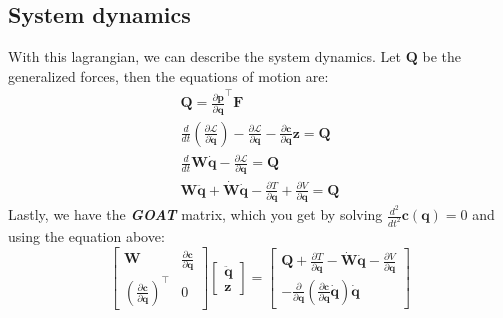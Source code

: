 \subsection{System dynamics}
With this lagrangian, we can describe the system dynamics. Let $\mathbf{Q}$ be the generalized forces, then the equations of motion are:
\begin{subequations}
    \begin{align}
    \mathbf{Q} = \frac{\partial \mathbf{p}}{\partial \mathbf{q}}^\top \mathbf{F} \\
    \frac{d}{dt}\left(\frac{\partial \mathcal{L}}{\partial \dot{\mathbf{q}}}\right) - \frac{\partial \mathcal{L}}{\partial \mathbf{q}} - \frac{\partial \mathbf{c}}{\partial \mathbf{q}}\mathbf{z}= \mathbf{Q} \\
    \frac{d}{dt}\mathbf{W}\mathbf{\dot{q}} - \frac{\partial \mathcal{L}}{\partial \mathbf{q}} = \mathbf{Q} \\
    \mathbf{W}\mathbf{\ddot{q}} + \dot{\mathbf{W}}\mathbf{\dot{q}} - \frac{\partial T}{\partial \mathbf{q}} + \frac{\partial V}{\partial \mathbf{q}} = \mathbf{Q}
    \end{align}    
\end{subequations}
Lastly, we have the \textit{\textbf{GOAT}} matrix, which you get by solving $\frac{d^2}{dt^2}\mathbf{c(q)} = 0$ and using the equation above:
\begin{equation}
    \begin{bmatrix}
        \mathbf{W} & \frac{\partial \mathbf{c}}{\partial \mathbf{q}} \\
        \left(\frac{\partial \mathbf{c}}{\partial \mathbf{q}}\right)^\top & 0
    \end{bmatrix} \begin{bmatrix}
        \mathbf{\ddot{q}} \\
        \mathbf{z}
    \end{bmatrix} = \begin{bmatrix}
        \mathbf{Q} + \frac{\partial T}{\partial \mathbf{q}} - \dot{\mathbf{W}}\dot{\mathbf{q}} - \frac{\partial V}{\partial \mathbf{q}} \\
        - \frac{\partial}{\partial \mathbf{q}} \left(\frac{\partial \mathbf{c}}{\partial \mathbf{q}}\dot{\mathbf{q}}\right) \mathbf{\dot{q}}
    \end{bmatrix}
\end{equation}